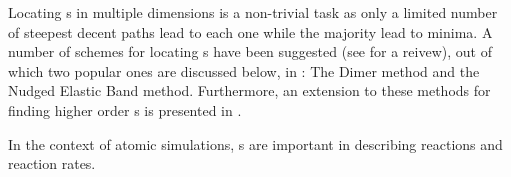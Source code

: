 Locating \sap{}s in multiple dimensions is a non-trivial task as only a limited number of steepest decent paths lead to each one while the majority lead to minima.
A number of schemes  for locating s have been suggested (see \cite{sp-mep-review-2002} for a reivew), out of which two popular ones are discussed below, in : The Dimer method and the Nudged Elastic Band method.
Furthermore, an extension to these methods for finding higher order \sap{}s is presented in .

In the context of atomic simulations, \sap{}s are important in describing reactions and reaction rates.
